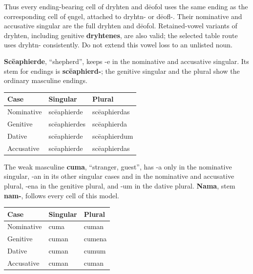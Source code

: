 Thus every ending-bearing cell of dryhten and dēofol uses the same ending as the corresponding cell of ęngel, attached to dryhtn- or dēofl-. Their nominative and accusative singular are the full dryhten and dēofol. Retained-vowel variants of dryhten, including genitive \textbf{dryhtenes}, are also valid; the selected table route uses dryhtn- consistently. Do not extend this vowel loss to an unlisted noun.

\textbf{Scēaphierde}, “shepherd”, keeps -e in the nominative and accusative singular. Its stem for endings is \textbf{scēaphierd-}; the genitive singular and the plural show the ordinary masculine endings.

\par\begingroup
\fontsize{10.5}{13.2}\selectfont
\setlength{\LTleft}{0pt}\setlength{\LTright}{\fill}
\noindent
\begin{tabular}{@{}>{\raggedright\arraybackslash}p{34.82mm}>{\raggedright\arraybackslash}p{41.78mm}>{\raggedright\arraybackslash}p{41.78mm}@{}}
\toprule
\textbf{Case} & \textbf{Singular} & \textbf{Plural} \\
\midrule
Nominative & scēaphierde & scēaphierdas \\
Genitive & scēaphierdes & scēaphierda \\
Dative & scēaphierde & scēaphierdum \\
Accusative & scēaphierde & scēaphierdas \\
\bottomrule
\end{tabular}
\par\endgroup

The weak masculine \textbf{cuma}, “stranger, guest”, has -a only in the nominative singular, -an in its other singular cases and in the nominative and accusative plural, -ena in the genitive plural, and -um in the dative plural. \textbf{Nama}, stem \textbf{nam-}, follows every cell of this model.

\par\begingroup
\fontsize{10.5}{13.2}\selectfont
\setlength{\LTleft}{0pt}\setlength{\LTright}{\fill}
\noindent
\begin{tabular}{@{}>{\raggedright\arraybackslash}p{39.46mm}>{\raggedright\arraybackslash}p{39.46mm}>{\raggedright\arraybackslash}p{39.46mm}@{}}
\toprule
\textbf{Case} & \textbf{Singular} & \textbf{Plural} \\
\midrule
Nominative & cuma & cuman \\
Genitive & cuman & cumena \\
Dative & cuman & cumum \\
Accusative & cuman & cuman \\
\bottomrule
\end{tabular}
\par\endgroup

